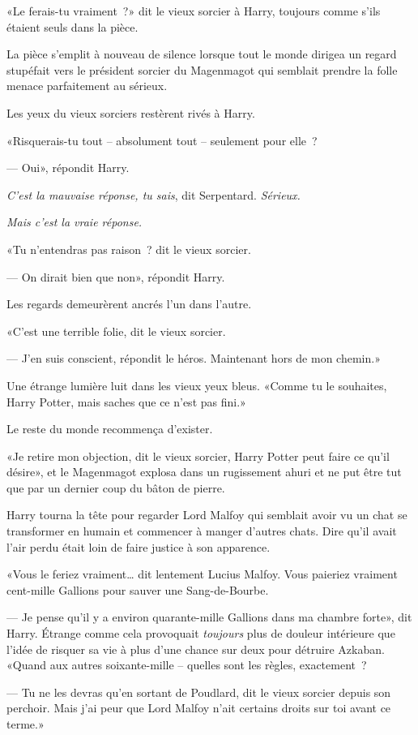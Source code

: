«Le ferais-tu vraiment~?» dit le vieux sorcier à Harry, toujours comme s'ils étaient seuls dans la pièce.

La pièce s'emplit à nouveau de silence lorsque tout le monde dirigea un regard stupéfait vers le président sorcier du Magenmagot qui semblait prendre la folle menace parfaitement au sérieux.

Les yeux du vieux sorciers restèrent rivés à Harry.

«Risquerais-tu tout -- absolument tout -- seulement pour elle~?

--- Oui», répondit Harry.

\emph{C'est la mauvaise réponse, tu sais}, dit Serpentard. \emph{Sérieux.}

\emph{Mais c'est la vraie réponse.}

«Tu n'entendras pas raison~? dit le vieux sorcier.

--- On dirait bien que non», répondit Harry.

Les regards demeurèrent ancrés l'un dans l'autre.

«C'est une terrible folie, dit le vieux sorcier.

--- J'en suis conscient, répondit le héros. Maintenant hors de mon chemin.»

Une étrange lumière luit dans les vieux yeux bleus. «Comme tu le souhaites, Harry Potter, mais saches que ce n'est pas fini.»

Le reste du monde recommença d'exister.

«Je retire mon objection, dit le vieux sorcier, Harry Potter peut faire ce qu'il désire», et le Magenmagot explosa dans un rugissement ahuri et ne put être tut que par un dernier coup du bâton de pierre.

Harry tourna la tête pour regarder Lord Malfoy qui semblait avoir vu un chat se transformer en humain et commencer à manger d'autres chats. Dire qu'il avait l'air perdu était loin de faire justice à son apparence.

«Vous le feriez vraiment… dit lentement Lucius Malfoy. Vous paieriez vraiment cent-mille Gallions pour sauver une Sang-de-Bourbe.

--- Je pense qu'il y a environ quarante-mille Gallions dans ma chambre forte», dit Harry. Étrange comme cela provoquait \emph{toujours} plus de douleur intérieure que l'idée de risquer sa vie à plus d'une chance sur deux pour détruire Azkaban. «Quand aux autres soixante-mille -- quelles sont les règles, exactement~?

--- Tu ne les devras qu'en sortant de Poudlard, dit le vieux sorcier depuis son perchoir. Mais j'ai peur que Lord Malfoy n'ait certains droits sur toi avant ce terme.»

